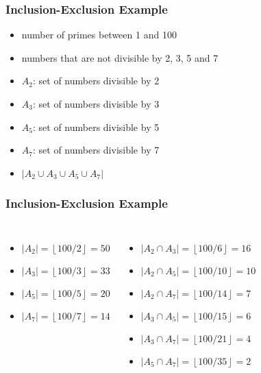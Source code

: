 \documentclass[dvipsnames]{beamer}
\begin{document}
\begin{frame}
  \frametitle{Inclusion-Exclusion Example}

  \begin{itemize}
    \item number of primes between 1 and 100
    \item numbers that are not divisible by 2, 3, 5 and 7

    \pause
    \medskip
    \item $A_2$: set of numbers divisible by 2
    \item $A_3$: set of numbers divisible by 3
    \item $A_5$: set of numbers divisible by 5
    \item $A_7$: set of numbers divisible by 7

    \pause
    \medskip
    \item $|A_2 \cup A_3 \cup A_5 \cup A_7|$
  \end{itemize}
\end{frame}

\begin{frame}
  \frametitle{Inclusion-Exclusion Example}

  \begin{columns}[t]
    \begin{itemize}
      \item $|A_2| = \left\lfloor 100/2 \right\rfloor = 50$
      \item $|A_3| = \left\lfloor 100/3 \right\rfloor = 33$
      \item $|A_5| = \left\lfloor 100/5 \right\rfloor = 20$
      \item $|A_7| = \left\lfloor 100/7 \right\rfloor = 14$
    \end{itemize}

    \pause
    \begin{itemize}
      \item $|A_2 \cap A_3| = \left\lfloor 100/6  \right\rfloor = 16$
      \item $|A_2 \cap A_5| = \left\lfloor 100/10 \right\rfloor = 10$
      \item $|A_2 \cap A_7| = \left\lfloor 100/14 \right\rfloor = 7$
      \item $|A_3 \cap A_5| = \left\lfloor 100/15 \right\rfloor = 6$
      \item $|A_3 \cap A_7| = \left\lfloor 100/21 \right\rfloor = 4$
      \item $|A_5 \cap A_7| = \left\lfloor 100/35 \right\rfloor = 2$
    \end{itemize}
  \end{columns}
\end{frame}
\end{document}
